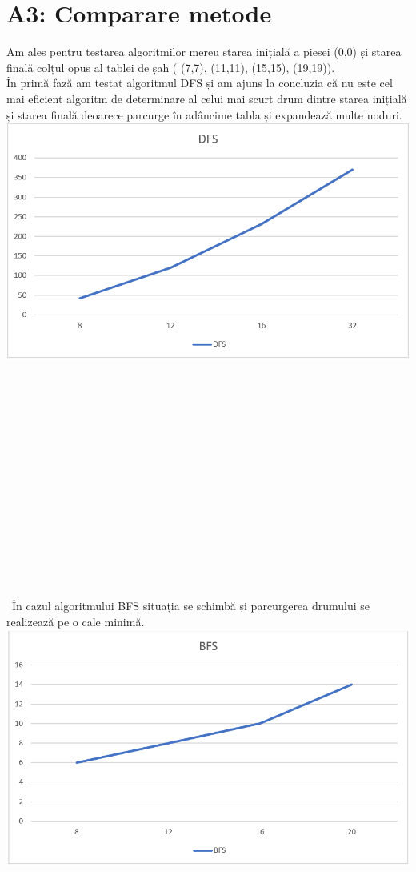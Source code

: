 \documentclass[a4paper,12pt]{report}
\begin{document}
\chapter{A3: Comparare metode}
 Am ales pentru testarea algoritmilor mereu starea inițială a piesei (0,0) și starea finală colțul opus al tablei de șah ( (7,7), (11,11), (15,15), (19,19)).
 \\În primă fază am testat algoritmul DFS și am ajuns la concluzia că nu este cel mai eficient algoritm de determinare al celui mai scurt drum dintre starea inițială și starea finală deoarece parcurge în adâncime tabla și expandează multe noduri.\\
 \includegraphics{fig/DFS.PNG}\\
 \\\\\\\\\\\\\\\\\\\\\\\\\\\\\\\
 În cazul algoritmului BFS situația se schimbă și parcurgerea drumului se realizează pe o cale minimă.\\
 \includegraphics{fig/BFS.PNG}
 
\end{document}
